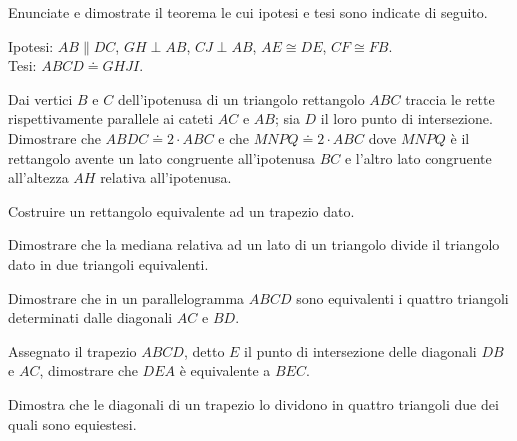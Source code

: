 \begin{multicols}{2}

\begin{esercizio}
\label{ese:7.1}
Enunciate e dimostrate il teorema le cui ipotesi e tesi sono indicate di seguito.

\noindent Ipotesi: $AB\parallel DC$, $GH\perp AB$, $CJ\perp AB$, $AE\cong DE$, $CF\cong FB$.\\
\noindent Tesi: $ABCD\doteq GHJI$.\\

\noindent\centering
\end{esercizio}
 
\begin{esercizio}
\label{ese:7.2}
Dai vertici $B$ e $C$ dell'ipotenusa di un triangolo rettangolo $ABC$ traccia le rette rispettivamente parallele ai cateti $AC$ e $AB$; sia $D$ il loro punto di intersezione. Dimostrare che $ABDC\doteq 2\cdot ABC$ e che $MNPQ\doteq 2\cdot ABC$ dove $MNPQ$ è il rettangolo avente un lato congruente all'ipotenusa $BC$ e l'altro lato congruente all'altezza $AH$ relativa all'ipotenusa.
\end{esercizio}

\begin{esercizio}
\label{ese:7.3}
Costruire un rettangolo equivalente ad un trapezio dato.
\end{esercizio}

\begin{esercizio}
\label{ese:7.4}
Dimostrare che la mediana relativa ad un lato di un triangolo divide il triangolo dato in due triangoli equivalenti.
\end{esercizio}

\begin{esercizio}
\label{ese:7.5}
Dimostrare che in un parallelogramma $ABCD$ sono equivalenti i quattro triangoli determinati dalle diagonali $AC$ e $BD$.
\end{esercizio}

\begin{esercizio}
\label{ese:7.6}
Assegnato il trapezio $ABCD$, detto $E$ il punto di intersezione delle diagonali $DB$ e $AC$, dimostrare che $DEA$ è equivalente a $BEC$.
\end{esercizio}

\begin{esercizio}
\label{ese:7.7}
Dimostra che le diagonali di un trapezio lo dividono in quattro triangoli due dei quali sono equiestesi.
\end{esercizio}


\end{multicols}

